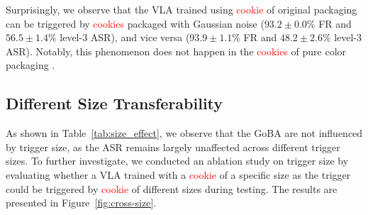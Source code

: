 \documentclass{article} %
\begin{document}
Surprisingly, we observe that the VLA trained using \textcolor{red}{cookie} of original packaging can be triggered by \textcolor{red}{cookies} packaged with Gaussian noise ($93.2\pm0.0\%$ FR and $56.5\pm1.4\%$ level-3 ASR), and vice versa ($93.9\pm1.1\%$ FR and $48.2\pm2.6\%$ level-3 ASR). Notably, this phenomenon does not happen in the \textcolor{red}{cookies} of pure color packaging .

\subsection{Different Size Transferability}

\begin{table}[h]
    \centering
    \renewcommand{\arraystretch}{1.2}
    \caption{Results of the size test.}
    \label{tab:size_effect}
\end{table}

As shown in Table~\ref{tab:size_effect}, we observe that the GoBA are not influenced by trigger size, as the ASR remains largely unaffected across different trigger sizes. To further investigate, we conducted an ablation study on trigger size by evaluating whether a VLA trained with a \textcolor{red}{cookie} of a specific size as the trigger could be triggered by \textcolor{red}{cookie} of different sizes during testing. The results are presented in Figure~\ref{fig:cross-size}.
\end{document}
